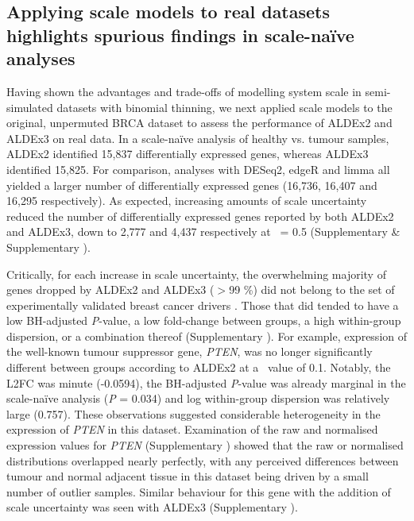 \documentclass[10pt,letterpaper]{article}
\begin{document}
\subsection*{Applying scale models to real datasets highlights spurious findings in scale-na\"ive analyses}
Having shown the advantages and trade-offs of modelling system scale in semi-simulated datasets with binomial thinning, we next applied scale models to the original, unpermuted BRCA dataset to assess the performance of ALDEx2 and ALDEx3 on real data. In a scale-na\"ive analysis of healthy vs. tumour samples, ALDEx2 identified 15,837 differentially expressed genes, whereas ALDEx3 identified 15,825. For comparison, analyses with DESeq2, edgeR and limma all yielded a larger number of differentially expressed genes (16,736, 16,407 and 16,295 respectively). As expected, increasing amounts of scale uncertainty reduced the number of differentially expressed genes reported by both ALDEx2 and ALDEx3, down to 2,777 and 4,437 respectively at \textgamma~= 0.5 (Supplementary  \& Supplementary ).

Critically, for each increase in scale uncertainty, the overwhelming majority of genes dropped by ALDEx2 and ALDEx3 ($>$99 \%) did not belong to the set of experimentally validated breast cancer drivers \cite{repana_network_2019}. Those that did tended to have a low BH-adjusted \textit{P}-value, a low fold-change between groups, a high within-group dispersion, or a combination thereof (Supplementary ). For example, expression of the well-known tumour suppressor gene, \textit{PTEN}, was no longer significantly different between groups according to ALDEx2 at a \textgamma~value of 0.1. Notably, the L2FC was minute (-0.0594), the BH-adjusted \textit{P}-value was already marginal in the scale-na\"ive analysis (\textit{P} = 0.034) and log within-group dispersion was relatively large (0.757). These observations suggested considerable heterogeneity in the expression of \textit{PTEN} in this dataset. Examination of the raw and normalised expression values for \textit{PTEN} (Supplementary ) showed that the raw or normalised distributions overlapped nearly perfectly, with any perceived differences between tumour and normal adjacent tissue in this dataset being driven by a small number of outlier samples. Similar behaviour for this gene with the addition of scale uncertainty was seen with ALDEx3 (Supplementary ).
\end{document}
